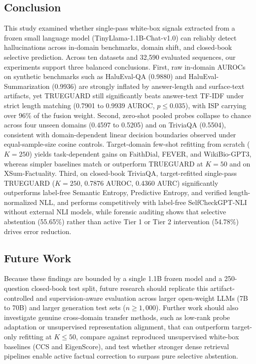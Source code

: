 \documentclass{ieeeaccess}
\begin{document}
\subsection{Conclusion}
This study examined whether single-pass white-box signals extracted from a frozen small language model (TinyLlama-1.1B-Chat-v1.0) can reliably detect hallucinations across in-domain benchmarks, domain shift, and closed-book selective prediction. Across ten datasets and 32,590 evaluated sequences, our experiments support three balanced conclusions. First, raw in-domain AUROCs on synthetic benchmarks such as HaluEval-QA (0.9880) and HaluEval-Summarization (0.9936) are strongly inflated by answer-length and surface-text artifacts, yet TRUEGUARD still significantly beats answer-text TF-IDF under strict length matching (0.7901 to 0.9939 AUROC, $p \le 0.035$), with ISP carrying over 96\% of the fusion weight. Second, zero-shot pooled probes collapse to chance across four unseen domains (0.4597 to 0.5205) and on TriviaQA (0.5504), consistent with domain-dependent linear decision boundaries observed under equal-sample-size cosine controls. Target-domain few-shot refitting from scratch ($K = 250$) yields task-dependent gains on FaithDial, FEVER, and WikiBio-GPT3, whereas simpler baselines match or outperform TRUEGUARD at $K = 50$ and on XSum-Factuality. Third, on closed-book TriviaQA, target-refitted single-pass TRUEGUARD ($K = 250$, 0.7876 AUROC, 0.4360 AURC) significantly outperforms label-free Semantic Entropy, Predictive Entropy, and verified length-normalized NLL, and performs competitively with label-free SelfCheckGPT-NLI without external NLI models, while forensic auditing shows that selective abstention (55.65\%) rather than active Tier 1 or Tier 2 intervention (54.78\%) drives error reduction.

\subsection{Future Work}
Because these findings are bounded by a single 1.1B frozen model and a 250-question closed-book test split, future research should replicate this artifact-controlled and supervision-aware evaluation across larger open-weight LLMs (7B to 70B) and larger generation test sets ($n \ge 1{,}000$). Further work should also investigate genuine cross-domain transfer methods, such as low-rank probe adaptation or unsupervised representation alignment, that can outperform target-only refitting at $K \le 50$, compare against reproduced unsupervised white-box baselines (CCS and EigenScore), and test whether stronger dense retrieval pipelines enable active factual correction to surpass pure selective abstention.
\end{document}
